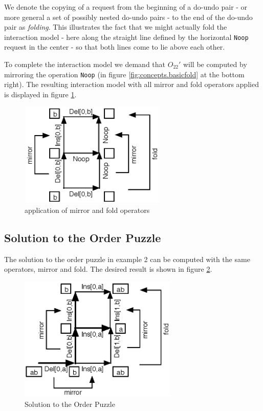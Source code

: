 We denote the copying of a request from the beginning of a do-undo pair - or more general a set of possibly nested do-undo pairs - to the end of the do-undo pair as \emph{folding}. This illustrates the fact that we might actually fold the interaction model - here along the straight line defined by the horizontal \texttt{Noop} request in the center - so that both lines come to lie above each other. 

To complete the interaction model we demand that $O_{22}'$ will be computed by mirroring the operation \texttt{Noop} (in figure \ref{fig:concepts.basicfold} at the bottom right). The resulting interaction model with all mirror and fold operators applied is displayed in figure \ref{fig:concepts.basicfold-solution}.

\begin{figure}[htb]
 \centering
 \includegraphics[width=6.99cm,height=4.97cm]{../../images/concepts_basicfold-solution.eps}
 \caption{application of mirror and fold operators}
 \label{fig:concepts.basicfold-solution}
\end{figure}


\subsection{Solution to the Order Puzzle}
\label{sect:concepts.order-puzzle-solution}
The solution to the order puzzle in example 2 can be computed with the same operators, mirror and fold. The desired result is shown in figure \ref{fig:concepts.orderpuzzle}.

\begin{figure}[htb]
 \centering
 \includegraphics[width=7.55cm,height=5.96cm]{../../images/concepts_orderpuzzle.eps}
 \caption{Solution to the Order Puzzle}
 \label{fig:concepts.orderpuzzle}
\end{figure}


